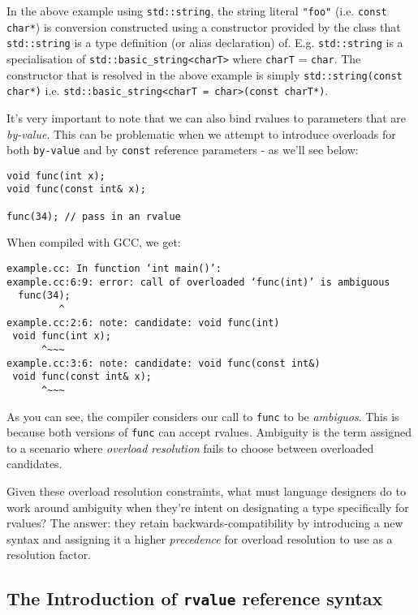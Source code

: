 		In the above example using \texttt{std::string}, the string literal
		\texttt{"foo"} (i.e. \texttt{const char*}) is conversion constructed
		using a constructor provided by the class that \texttt{std::string} is a
		type definition (or alias declaration) of. E.g. \texttt{std::string} is
		a specialisation of \texttt{std::basic\_string<charT>} where
		\texttt{charT} = \texttt{char}. The constructor that is resolved in the
		above example is simply \texttt{std::string(const char*)} i.e.
		\texttt{std::basic\_string<charT = char>(const charT*)}.

		It's very important to note that we can also bind rvalues to parameters
		that are \textit{by-value}. This can be problematic when we attempt to
		introduce overloads for both \texttt{by-value} and by \texttt{const}
		reference parameters - as we'll see below:

		\begin{verbatim}
void func(int x);
void func(const int& x);

func(34); // pass in an rvalue
		\end{verbatim}

		When compiled with GCC, we get:

\begin{verbatim}
example.cc: In function ‘int main()’:
example.cc:6:9: error: call of overloaded ‘func(int)’ is ambiguous
  func(34);
         ^
example.cc:2:6: note: candidate: void func(int)
 void func(int x);
      ^~~~
example.cc:3:6: note: candidate: void func(const int&)
 void func(const int& x);
      ^~~~
\end{verbatim}

		As you can see, the compiler considers our call to \texttt{func} to be
		\textit{ambiguos}. This is because both versions of \texttt{func} can
		accept rvalues. Ambiguity is the term assigned to a scenario where
		\textit{overload resolution} fails to choose between overloaded
		candidates.

		Given these overload resolution constraints, what must language
		designers do to work around ambiguity when they're intent on designating
		a type specifically for rvalues? The answer: they retain
		backwards-compatibility by introducing a new syntax and assigning it a
		higher \textit{precedence} for overload resolution to use as a
		resolution factor.

	\subsection{The Introduction of \texttt{rvalue} reference syntax}
		
